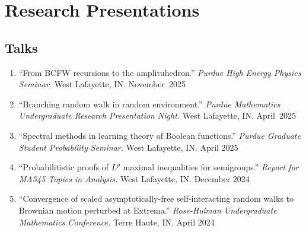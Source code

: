 \documentclass[11pt,letterpaper]{article}
\begin{document}
\section*{Research Presentations}
\subsection*{Talks}
\begin{enumerate}
    \item ``From BCFW recursions to the amplituhedron.''
    \textit{Purdue High Energy Physics Seminar.} West Lafayette, IN. \hfill November~2025

    \item {``Branching random walk in random environment.''}
    \textit{Purdue Mathematics Undergraduate Research Presentation Night.} West Lafayette, IN. \hfill April~2025

    \item {``Spectral methods in learning theory of Boolean functions.''}
    \textit{Purdue Graduate Student Probability Seminar.} West Lafayette, IN. \hfill April 2025

    \item {``Probabilitistic proofs of $L^p$ maximal inequalities for semigroups.''} \textit{Report for MA545 Topics in Analysis.} West Lafayette, IN. \hfill December 2024

    \item {``Convergence of scaled asymptotically-free self-interacting random walks to Brownian motion perturbed at Extrema.''}
    \textit{Rose-Hulman Undergraduate Mathematics Conference.} Terre Haute, IN. \hfill April 2024

    
\end{enumerate}
\end{document}
